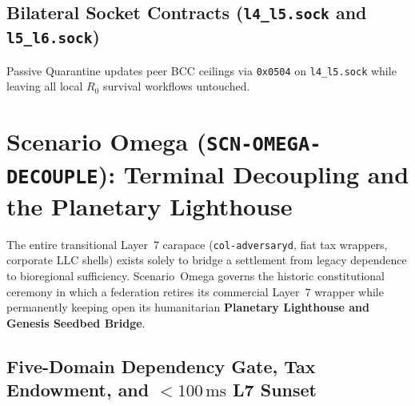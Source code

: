 \subsection{Bilateral Socket Contracts (\texttt{l4\_l5.sock} and \texttt{l5\_l6.sock})}

Passive Quarantine updates peer BCC ceilings via \texttt{0x0504} on \texttt{l4\_l5.sock} while leaving
all local $R_0$ survival workflows untouched.

\section{Scenario Omega (\texttt{SCN-OMEGA-DECOUPLE}): Terminal Decoupling and the Planetary Lighthouse}
\label{sec:wavef-omega}

The entire transitional Layer~7 carapace (\texttt{col-adversaryd}, fiat tax wrappers, corporate LLC
shells) exists solely to bridge a settlement from legacy dependence to bioregional sufficiency.
Scenario~Omega governs the historic constitutional ceremony in which a federation retires its
commercial Layer~7 wrapper while permanently keeping open its humanitarian \textbf{Planetary Lighthouse
and Genesis Seedbed Bridge}.

\subsection{Five-Domain Dependency Gate, Tax Endowment, and $< 100\,\mathrm{ms}$ L7 Sunset}

